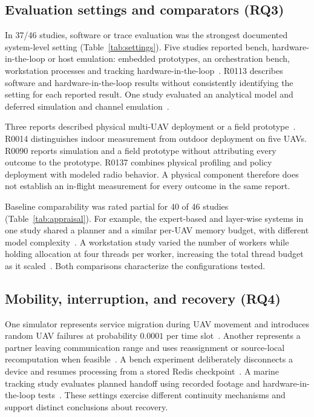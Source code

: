 \documentclass[pdflatex,sn-vancouver-num]{sn-jnl}
\begin{document}
\subsection{Evaluation settings and comparators (RQ3)}\label{sec:rq3}
In 37/46 studies, software or trace evaluation was the strongest documented system-level setting (Table~\ref{tab:settings}). Five studies reported bench, hardware-in-the-loop or host emulation: embedded prototypes, an orchestration bench, workstation processes and tracking hardware-in-the-loop~\cite{R0038,R0062,R0113,R0125,R0292}. R0113 describes software and hardware-in-the-loop results without consistently identifying the setting for each reported result. One study evaluated an analytical model and deferred simulation and channel emulation~\cite{R0121}.

Three reports described physical multi-UAV deployment or a field prototype~\cite{R0014,R0090,R0137}. R0014 distinguishes indoor measurement from outdoor deployment on five UAVs. R0090 reports simulation and a field prototype without attributing every outcome to the prototype. R0137 combines physical profiling and policy deployment with modeled radio behavior. A physical component therefore does not establish an in-flight measurement for every outcome in the same report.

Baseline comparability was rated partial for 40 of 46 studies (Table~\ref{tab:appraisal}). For example, the expert-based and layer-wise systems in one study shared a planner and a similar per-UAV memory budget, with different model complexity~\cite{R0118}. A workstation study varied the number of workers while holding allocation at four threads per worker, increasing the total thread budget as it scaled~\cite{R0125}. Both comparisons characterize the configurations tested.

\subsection{Mobility, interruption, and recovery (RQ4)}\label{sec:rq4}
One simulator represents service migration during UAV movement and introduces random UAV failures at probability $0.0001$ per time slot~\cite{R0002}. Another represents a partner leaving communication range and uses reassignment or source-local recomputation when feasible~\cite{R0092}. A bench experiment deliberately disconnects a device and resumes processing from a stored Redis checkpoint~\cite{R0038}. A marine tracking study evaluates planned handoff using recorded footage and hardware-in-the-loop tests~\cite{R0292}. These settings exercise different continuity mechanisms and support distinct conclusions about recovery.
\end{document}
